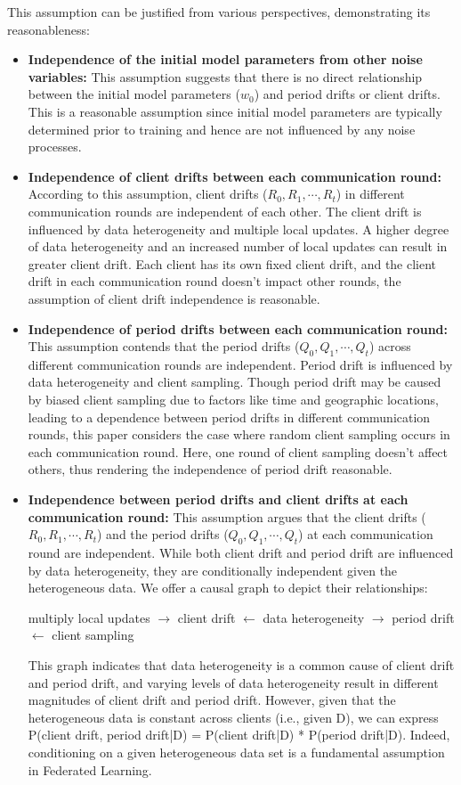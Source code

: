 This assumption can be justified from various perspectives, demonstrating its reasonableness:
\begin{itemize}[leftmargin=*,nosep]
   \item \textbf{Independence of the initial model parameters from other noise variables:} This assumption suggests that there is no direct relationship between the initial model parameters ($w_0$) and period drifts or client drifts. This is a reasonable assumption since initial model parameters are typically determined prior to training and hence are not influenced by any noise processes.
   \item \textbf{Independence of client drifts between each communication round:} According to this assumption, client drifts ($R_0, R_1, \cdots, R_t$) in different communication rounds are independent of each other. The client drift is influenced by data heterogeneity and multiple local updates. A higher degree of data heterogeneity and an increased number of local updates can result in greater client drift. Each client has its own fixed client drift\citep{guo2021towards}, and the client drift in each communication round doesn't impact other rounds, the assumption of client drift independence is reasonable. 
   \item \textbf{Independence of period drifts between each communication round:} This assumption contends that the period drifts ($Q_0, Q_1, \cdots, Q_t$) across different communication rounds are independent. Period drift is influenced by data heterogeneity and client sampling. Though period drift may be caused by biased client sampling due to factors like time and geographic locations, leading to a dependence between period drifts in different communication rounds, this paper considers the case where random client sampling occurs in each communication round. Here, one round of client sampling doesn't affect others, thus rendering the independence of period drift reasonable.
   \item \textbf{Independence between period drifts and client drifts at each communication round:} This assumption argues that the client drifts ($R_0, R_1, \cdots, R_t$) and the period drifts ($Q_0, Q_1, \cdots, Q_t$) at each communication round are independent. While both client drift and period drift are influenced by data heterogeneity, they are conditionally independent given the heterogeneous data. We offer a causal graph to depict their relationships:
    \begin{center}
      multiply local updates $\longrightarrow$  client drift $\longleftarrow$ data heterogeneity $\longrightarrow$ period drift $\longleftarrow$  client sampling
   \end{center}
   This graph indicates that data heterogeneity is a common cause of client drift and period drift, and varying levels of data heterogeneity result in different magnitudes of client drift and period drift. However, given that the heterogeneous data is constant across clients (i.e., given D), we can express P(client drift, period drift|D) = P(client drift|D) * P(period drift|D). Indeed, conditioning on a given heterogeneous data set is a fundamental assumption in Federated Learning.
\end{itemize}

